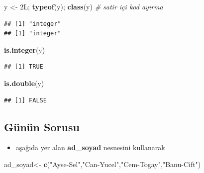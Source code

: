 \documentclass[
  oneside]{book}
\newenvironment{Shaded}{\begin{snugshade}}{\end{snugshade}}
\newcommand{\CommentTok}[1]{\textcolor[rgb]{0.56,0.35,0.01}{\textit{#1}}}
\newcommand{\FunctionTok}[1]{\textcolor[rgb]{0.13,0.29,0.53}{\textbf{#1}}}
\newcommand{\NormalTok}[1]{#1}
\newcommand{\OtherTok}[1]{\textcolor[rgb]{0.56,0.35,0.01}{#1}}
\newcommand{\StringTok}[1]{\textcolor[rgb]{0.31,0.60,0.02}{#1}}
\providecommand{\tightlist}{%
  \setlength{\itemsep}{0pt}\setlength{\parskip}{0pt}}
\begin{document}
\begin{Shaded}
\begin{Highlighting}[]
\NormalTok{y }\OtherTok{\textless{}{-}}\NormalTok{ 2L; }\FunctionTok{typeof}\NormalTok{(y); }\FunctionTok{class}\NormalTok{(y) }\CommentTok{\# satir içi kod ayırma}
\end{Highlighting}
\end{Shaded}

\begin{verbatim}
## [1] "integer"
## [1] "integer"
\end{verbatim}

\begin{Shaded}
\begin{Highlighting}[]
\FunctionTok{is.integer}\NormalTok{(y)}
\end{Highlighting}
\end{Shaded}

\begin{verbatim}
## [1] TRUE
\end{verbatim}

\begin{Shaded}
\begin{Highlighting}[]
\FunctionTok{is.double}\NormalTok{(y)}
\end{Highlighting}
\end{Shaded}

\begin{verbatim}
## [1] FALSE
\end{verbatim}

\hypertarget{guxfcnuxfcn-sorusu-1}{%
\subsection{Günün Sorusu}\label{guxfcnuxfcn-sorusu-1}}

\begin{itemize}
\tightlist
\item
  aşağıda yer alan \textbf{ad\_soyad} nesnesini kullanarak
\end{itemize}

\begin{Shaded}
\begin{Highlighting}[]
\NormalTok{ad\_soyad}\OtherTok{\textless{}{-}} \FunctionTok{c}\NormalTok{(}\StringTok{"Ayse{-}Sel"}\NormalTok{,}\StringTok{"Can{-}Yucel"}\NormalTok{,}\StringTok{"Cem{-}Togay"}\NormalTok{,}\StringTok{"Banu{-}Cift"}\NormalTok{)}
\end{Highlighting}
\end{Shaded}
\end{document}
